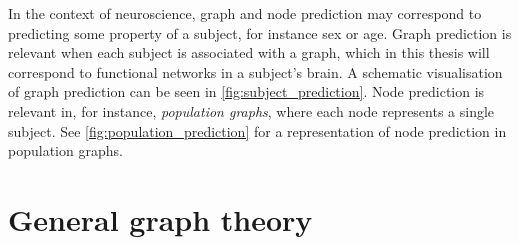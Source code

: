 In the context of neuroscience, graph and node prediction may correspond to predicting some property of a subject, for instance sex or age. Graph prediction is relevant when each subject is associated with a graph, which in this thesis will correspond to functional networks in a subject's brain. A schematic visualisation of graph prediction can be seen in \cref{fig:subject_prediction}. Node prediction is relevant in, for instance, \textit{population graphs}, where each node represents a single subject. See \cref{fig:population_prediction} for a representation of node prediction in population graphs. 








\section{General graph theory}
\label{sec:general_graph_theory}

